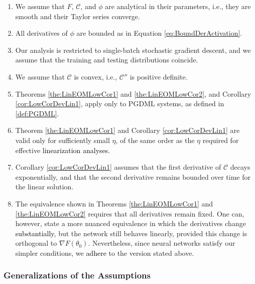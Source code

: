 \documentclass{article} %
\begin{document}
\begin{enumerate}
\item
\label{Zap:Asu1:1}
We assume that \(F\), \(\mathcal{C}\), and \(\phi\) are analytical in their parameters, i.e., they are smooth and their Taylor series converge.

\item
\label{Zap:Asu1:10}
All derivatives of \(\phi\) are bounded as in Equation \ref{eq:BoundDerActivation}.

\item
\label{Zap:Asu1:6}
Our analysis is restricted to single-batch stochastic gradient descent, and we assume that the training and testing distributions coincide.

\item
\label{Zap:Asu1:2}
We assume that \(\mathcal{C}\) is convex, i.e., \(\mathcal{C}''\) is positive definite.

\item
\label{Zap:Asu1:3}
Theorems \ref{the:LinEOMLowCor1} and \ref{the:LinEOMLowCor2}, and Corollary \ref{cor:LowCorDevLin1}, apply only to PGDML systems, as defined in \ref{def:PGDML}.

\item
\label{Zap:Asu1:4}
Theorem \ref{the:LinEOMLowCor1} and Corollary \ref{cor:LowCorDevLin1} are valid only for sufficiently small \(\eta\), of the same order as the \(\eta\) required for effective \textcolor{black}{linearization analyses}.

\item
\label{Zap:Asu1:5}
Corollary \ref{cor:LowCorDevLin1} assumes that the first derivative of \(\mathcal{C}\) decays exponentially, and that the second derivative remains bounded over time for the linear solution.

\item
The equivalence shown in Theorems \ref{the:LinEOMLowCor1} and \ref{the:LinEOMLowCor2} requires that all derivatives remain fixed. One can, however, state a more nuanced equivalence in which the derivatives change \textcolor{black}{substantially}, but the network still behaves linearly, provided this change is orthogonal to \(\nabla F\left(\theta_0\right)\). Nevertheless, since neural networks satisfy our simpler conditions, we \textcolor{black}{adhere} to the version stated above.
\end{enumerate}

\subsubsection{Generalizations of the Assumptions}
\end{document}
